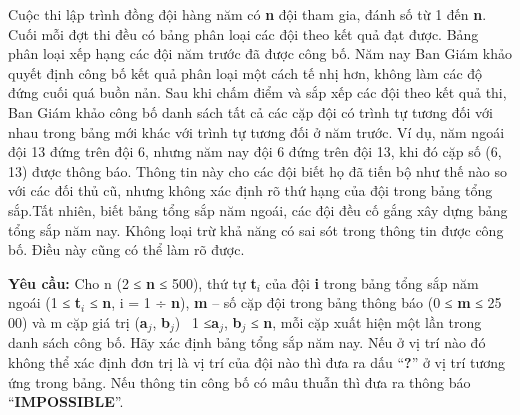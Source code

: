 Cuộc thi lập trình đồng đội hàng năm có \textbf{n} đội tham gia, đánh số từ 1 đến \textbf{n}. Cuối mỗi đợt thi đều có bảng phân loại các đội theo kết quả đạt được. Bảng phân loại xếp hạng các đội năm trước đã được công bố. Năm nay Ban Giám khảo quyết định công bố kết quả phân loại một cách tế nhị hơn, không làm các độ đứng cuối quá buồn nản. Sau khi chấm điểm và sắp xếp các đội theo kết quả thi, Ban Giám khảo công bố danh sách tất cả các cặp đội có trình tự tương đối với nhau trong bảng mới khác với trình tự tương đối ở năm trước. Ví dụ, năm ngoái đội 13 đứng trên đội 6, nhưng năm nay đội 6 đứng trên đội 13, khi đó cặp số (6, 13) được thông báo. Thông tin này cho các đội biết họ đã tiến bộ như thế nào so với các đối thủ cũ, nhưng không xác định rõ thứ hạng của đội trong bảng tổng sắp.Tất nhiên, biết bảng tổng sắp năm ngoái, các đội đều cố gắng xây dựng bảng tổng sắp năm nay. Không loại trừ khả năng có sai sót trong thông tin được công bố. Điều này cũng có thể làm rõ được.

\textbf{Yêu cầu:} Cho n (2 ≤ \textbf{n} ≤ 500), thứ tự \textbf{t$_i$} của đội \textbf{i} trong bảng tổng sắp năm ngoái (1 ≤ \textbf{t$_i$} ≤ \textbf{n}, i = 1 ÷ \textbf{n}), \textbf{m} – số cặp đội trong bảng thông báo (0 ≤ \textbf{m} ≤ 25 00) và m cặp giá trị (\textbf{a$_j$}, \textbf{b$_j$})  1 ≤\textbf{a$_j$}, \textbf{b$_j$} ≤ \textbf{n}, mỗi cặp xuất hiện một lần trong danh sách công bố. Hãy xác định bảng tổng sắp năm nay. Nếu ở vị trí nào đó không thể xác định đơn trị là vị trí của đội nào thì đưa ra dấu “\textbf{?}” ở vị trí tương ứng trong bảng. Nếu thông tin công bố có mâu thuẫn thì đưa ra thông báo “\textbf{IMPOSSIBLE}”.